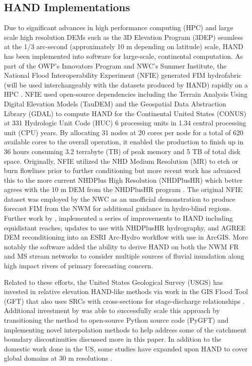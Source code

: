 \documentclass[draft]{dependencies/agujournal2019}
\begin{document}
\subsection{HAND Implementations}
%
Due to significant advances in high performance computing (HPC) and large scale high resolution DEMs such as the 3D Elevation Program (3DEP) seamless at the 1/3 arc-second (approximately 10 m depending on latitude) scale, HAND has been implemented into software for large-scale, continental computation. 
As part of the OWP's Innovators Program and NWC's Summer Institute, the National Flood Interoperability Experiment (NFIE) generated FIM hydrofabric (will be used interchangeably with the datasets produced by HAND) rapidly on a HPC \cite{maidment2017conceptual,liu2016cybergis}. 
NFIE used open-source dependencies including the Terrain Analysis Using Digital Elevation Models (TauDEM) \cite{tarboton2005terrain} and the Geospatial Data Abstraction Library (GDAL) \cite{warmerdam2008geospatial} to compute HAND for the Continental United States (CONUS) at 331 Hydrologic Unit Code (HUC) 6 processing units in 1.34 central processing unit (CPU) years.
By allocating 31 nodes at 20 cores per node for a total of 620 available cores to the overall operation, it enabled the production to finish up in 36 hours consuming 3.2 terrabyte (TB) of peak memory and 5 TB of total disk space.
Originally, NFIE utilized the NHD Medium Resolution (MR) to etch or burn flowlines prior to further conditioning but more recent work has advanced this to the more current NHDPlus High Resolution (NHDPlusHR) which better agrees with the 10 m DEM from the NHDPlusHR program \cite{liu2020height}. 
The original NFIE dataset was employed by the NWC as an unofficial demonstration to produce forecast FIM from the NWM for additional guidance in hydro-blind regions.
Further work by , implemented a series of improvements to HAND including equidistant reaches, updates to use with NHDPlusHR hydrography, and AGREE DEM reconditioning \cite{hellweger1997agree} into an ESRI Arc-Hydro workflow with use in ArcGIS. 
More notably the software added the ability to derive HAND on both the NWM FR and MS stream networks to consider multiple sources of fluvial inundation along high impact rivers of primary forecasting concern.

Related to these efforts, the United States Geological Survey (USGS) has invested in relative elevation HAND-like methods via work in the GIS Flood Tool (GFT) that also uses SRCs with cross-sections for stage-discharge relationships \cite{verdin2016software}.
Additional investment by  was able to successfully scale this approach by transitioning the method to open-source Python source code (PyGFT) and implementing novel interpolation methods to help address some of the catchment boundary discontinuities discussed more in this paper.
In addition to the domestic work done in the US, some studies have expanded upon HAND to cover global domains at 30 m resolutions \cite{yamazaki2019merit,donchyts2016global}.
%
\end{document}
